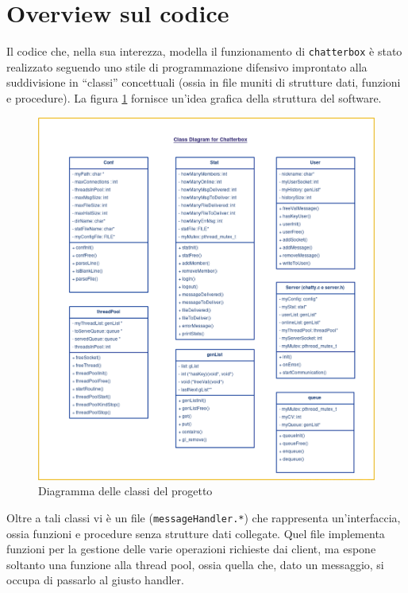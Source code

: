 \documentclass[12pt,a4paper]{article}
\begin{document}
							
\section{Overview sul codice}
Il codice che, nella sua interezza, modella il funzionamento di \texttt{chatterbox} è stato realizzato seguendo uno stile di programmazione difensivo improntato alla suddivisione in ``classi'' concettuali (ossia in file muniti di strutture dati, funzioni e procedure). La figura \ref{fig:diagramma} fornisce un'idea grafica della struttura del software.
\begin{figure}
\includegraphics[width=\textwidth]{chatty.png}
\caption{Diagramma delle classi del progetto \label{fig:diagramma}}
\end{figure}
Oltre a tali classi vi è un file (\texttt{messageHandler.*}) che rappresenta un'interfaccia, ossia funzioni e procedure senza strutture dati collegate. 
Quel file implementa funzioni per la gestione delle varie operazioni richieste dai client, ma espone soltanto una funzione alla thread pool, ossia quella che, dato un messaggio, si occupa di passarlo al giusto handler.
\end{document}
